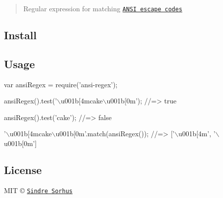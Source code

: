 \begin{quote}
Regular expression for matching \href{http://en.wikipedia.org/wiki/ANSI_escape_code}{\tt A\+N\+SI escape codes} \end{quote}


\subsection*{Install}




\subsection*{Usage}


\begin{DoxyCode}
var ansiRegex = require('ansi-regex');

ansiRegex().test('\(\backslash\)u001b[4mcake\(\backslash\)u001b[0m');
//=> true

ansiRegex().test('cake');
//=> false

'\(\backslash\)u001b[4mcake\(\backslash\)u001b[0m'.match(ansiRegex());
//=> ['\(\backslash\)u001b[4m', '\(\backslash\)u001b[0m']
\end{DoxyCode}


\subsection*{License}

M\+IT © \href{http://sindresorhus.com}{\tt Sindre Sorhus} 